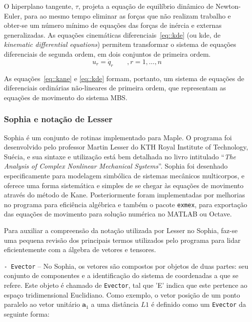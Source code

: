 O hiperplano tangente, $\tau$, projeta a equação de equilíbrio dinâmico de
Newton-Euler, para ao mesmo tempo eliminar as forças que não realizam trabalho e
obter-se um número mínimo de equações das forças de inércia e externas
generalizadas.
As equações cinemáticas diferenciais~\ref{eq::kde} (ou kde, de \textit{kinematic
differential equations}) permitem transformar o sistema de equações diferenciais
de segunda ordem, em dois conjuntos de primeira ordem.
%
\begin{equation} \label{eq::kde}
	u_r = \dot{q}_r \qquad, r = 1,\ldots,n
\end{equation}
%

As equações~\ref{eq::kane} e \ref{eq::kde} formam, portanto, um sistema de
equações de diferenciais ordinárias não-lineares de primeira ordem, que
representam as equações de movimento do sistema MBS.


\subsubsection{Sophia e notação de Lesser} \label{sec::lesser}

Sophia é um conjunto de rotinas implementado para Maple. O programa foi
desenvolvido pelo professor Martin Lesser do KTH Royal Institute of Technology,
Suécia, e sua sintaxe e utilização está bem detalhada no livro intitulado
``\textit{The Analysis of Complex Nonlinear Mechanical
Systems}''\cite{lesser1995analysis}. Sophia foi desenhado especificamente para
modelagem simbólica de sistemas mecânicos multicorpos, e oferece uma forma
sistemática e simples de se chegar às equações de movimento através do método de
Kane. Posteriormente foram implementadas por \citet{lennartsson1999efficient}
melhorias no programa para eficiência algébrica e também o pacote
\texttt{exmex}, para exportação das equações de movimento para solução numérica
no MATLAB ou Octave.

Para auxiliar a compreensão da notação utilizada por Lesser no Sophia, faz-se
uma pequena revisão dos principais termos utilizados pelo programa para lidar
eficientemente com a álgebra de vetores e tensores.

\medskip \noindent
\texttt{- Evector} -- No Sophia, os vetores são compostos por objetos de duas
partes:
seu conjunto de componentes e a identificação do sistema de coordenadas a que se
refere. Este objeto é chamado de \texttt{Evector}, tal que 'E' indica que este
pertence ao espaço tridimensional Euclidiano. Como exemplo, o vetor posição de
um ponto paralelo ao vetor unitário $\mathbf{a}_1$ a uma distância $L1$ é
definido como um \texttt{Evector} da seguinte forma:

